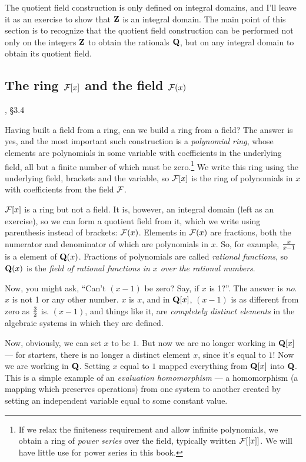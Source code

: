 The quotient field construction is only defined on integral domains,
and I'll leave it as an exercise to show that ${\bf Z}$ is an integral
domain.  The main point of this section is to recognize that the
quotient field construction can be performed not only on the integers
${\bf Z}$ to obtain the rationals ${\bf Q}$, but on any integral
domain to obtain its quotient field.


\subsection*{\qquad The ring ${\cal F}[x]$ and the field ${\cal F}(x)$}
, \S3.4

Having built a field from a ring, can we build a ring from a field?
The answer is yes, and the most important such construction is a {\it
polynomial ring}, whose elements are polynomials in some variable with
coefficients in the underlying field, all but a finite number of which
must be zero.\footnote{If we relax the finiteness requirement and
allow infinite polynomials, we obtain a ring of {\it power series}
over the field, typically written ${\cal F}[[x]]$.  We will have
little use for power series in this book.}  We write this ring using
the underlying field, brackets and the variable, so ${\cal F}[x]$ is
the ring of polynomials in $x$ with coefficients from the field ${\cal
F}$.

${\cal F}[x]$ is a ring but not a field.  It is, however, an
integral domain (left as an exercise), so we can form a quotient field
from it, which we write using parenthesis instead of brackets: ${\cal
F}(x)$.  Elements in ${\cal F}(x)$ are fractions, both the numerator
and denominator of which are polynomials in $x$.  So, for example,
${x}\over{x-1}$ is a element of ${\bf Q}(x)$.  Fractions of
polynomials are called {\it rational functions}, so ${\bf Q}(x)$ is
the {\it field of rational functions in $x$ over the rational numbers}.

Now, you might ask, ``Can't $(x-1)$ be zero?  Say, if $x$ is 1?''.
The answer is {\it no}.  $x$ is not 1 or any other number.  $x$ is
$x$, and in ${\bf Q}[x]$, $(x-1)$ is as different from zero as $3
\over 2$ is.  $(x-1)$, and things like it, are {\it
completely distinct elements} in the algebraic systems in which they
are defined.

Now, obviously, we can set $x$ to be $1$.  But now we are no longer
working in ${\bf Q}[x]$ --- for starters, there is no longer a
distinct element $x$, since it's equal to $1$!  Now we are working in
${\bf Q}$.  Setting $x$ equal to $1$ mapped everything from ${\bf
Q}[x]$ into ${\bf Q}$.  This is a simple example of an {\it evaluation
homomorphism} --- a homomorphism (a mapping which preserves
operations) from one system to another created by setting an
independent variable equal to some constant value.

